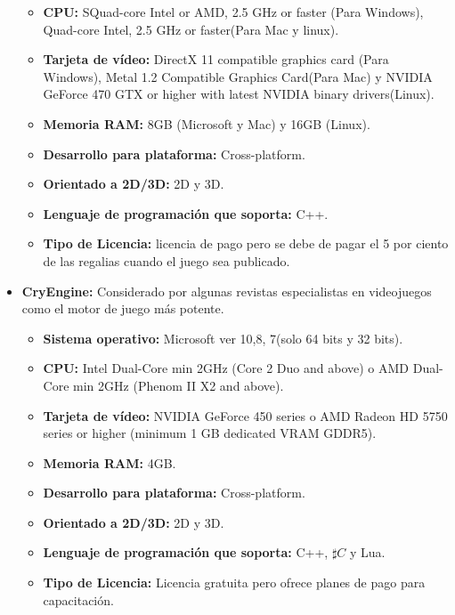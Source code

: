\begin{itemize}
\begin{itemize}
				\item \textbf{CPU:} SQuad-core Intel or AMD, 2.5 GHz or faster (Para Windows), Quad-core Intel, 2.5 GHz or faster(Para Mac y linux).
				\item \textbf{Tarjeta de vídeo:} DirectX 11 compatible graphics card (Para Windows), Metal 1.2 Compatible Graphics Card(Para Mac) y NVIDIA GeForce 470 GTX or higher with latest NVIDIA binary drivers(Linux). 
				\item \textbf{Memoria RAM:} 8GB (Microsoft y Mac) y 16GB (Linux).
				\item \textbf{Desarrollo para plataforma:} Cross-platform.
				\item \textbf{Orientado a 2D/3D:} 2D y 3D.
				\item \textbf{Lenguaje de programación que soporta:} C++.
				\item \textbf{Tipo de Licencia:} licencia de pago pero se debe de pagar el 5 por ciento de las regalias cuando el juego sea publicado. \cite{Ref:Unreal}
			\end{itemize}
		\item \textbf{CryEngine:} Considerado por algunas revistas especialistas en videojuegos como el motor de juego más potente. 
			\begin{itemize}
				\item \textbf{Sistema operativo:} Microsoft ver 10,8, 7(solo 64 bits y 32 bits).
				\item \textbf{CPU:} Intel Dual-Core min 2GHz (Core 2 Duo and above) o AMD Dual-Core min 2GHz (Phenom II X2 and above).
				\item \textbf{Tarjeta de vídeo:} NVIDIA GeForce 450 series o AMD Radeon HD 5750 series or higher (minimum 1 GB dedicated VRAM GDDR5). 
				\item \textbf{Memoria RAM:} 4GB.
				\item \textbf{Desarrollo para plataforma:} Cross-platform.
				\item \textbf{Orientado a 2D/3D:} 2D y 3D.
				\item \textbf{Lenguaje de programación que soporta:} C++, $\sharp C$ y Lua.
				\item \textbf{Tipo de Licencia:} Licencia gratuita pero ofrece planes de pago para capacitación. \cite{Ref:CryEngine}
			\end{itemize}						
		
	\end{itemize}